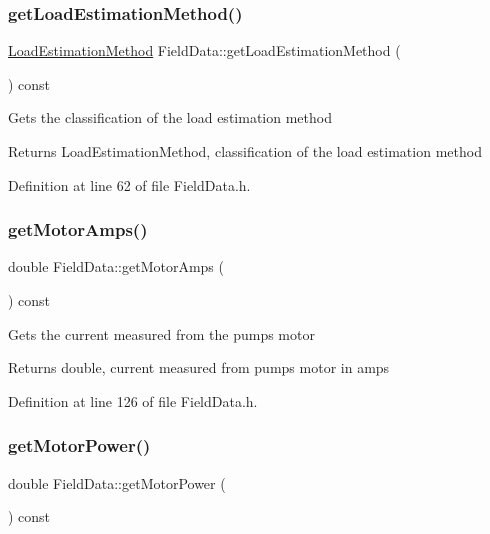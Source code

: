 \subsubsection{\texorpdfstring{get\+Load\+Estimation\+Method()}{getLoadEstimationMethod()}}
{\footnotesize\ttfamily \hyperlink{class_field_data_a424e89914ba5684c01bb269dbe3312fd}{Load\+Estimation\+Method} Field\+Data\+::get\+Load\+Estimation\+Method (\begin{DoxyParamCaption}{ }\end{DoxyParamCaption}) const\hspace{0.3cm}{\ttfamily [inline]}}

Gets the classification of the load estimation method \begin{DoxyReturn}{Returns}
Load\+Estimation\+Method, classification of the load estimation method 
\end{DoxyReturn}


Definition at line 62 of file Field\+Data.\+h.

\mbox{\label{class_field_data_ad2b4fffb00fa7cfa6f69487e1034989a}} 
\subsubsection{\texorpdfstring{get\+Motor\+Amps()}{getMotorAmps()}}
{\footnotesize\ttfamily double Field\+Data\+::get\+Motor\+Amps (\begin{DoxyParamCaption}{ }\end{DoxyParamCaption}) const\hspace{0.3cm}{\ttfamily [inline]}}

Gets the current measured from the pump\textquotesingle{}s motor \begin{DoxyReturn}{Returns}
double, current measured from pump\textquotesingle{}s motor in amps 
\end{DoxyReturn}


Definition at line 126 of file Field\+Data.\+h.

\mbox{\label{class_field_data_a3e8e1bf84bbd00b9b52b803147968c81}} 
\subsubsection{\texorpdfstring{get\+Motor\+Power()}{getMotorPower()}}
{\footnotesize\ttfamily double Field\+Data\+::get\+Motor\+Power (\begin{DoxyParamCaption}{ }\end{DoxyParamCaption}) const\hspace{0.3cm}{\ttfamily [inline]}}

